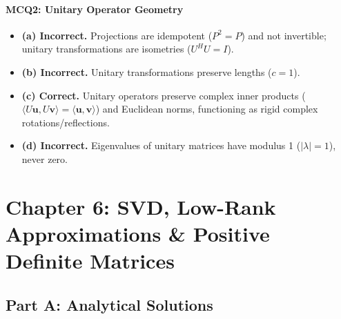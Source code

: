 \paragraph{MCQ2: Unitary Operator Geometry}
\begin{itemize}
    \item \textbf{(a) Incorrect.} Projections are idempotent ($P^2 = P$) and not invertible; unitary transformations are isometries ($U^H U = I$).
    \item \textbf{(b) Incorrect.} Unitary transformations preserve lengths ($c = 1$).
    \item \textbf{(c) Correct.} Unitary operators preserve complex inner products ($\langle U\mathbf{u}, U\mathbf{v} \rangle = \langle \mathbf{u}, \mathbf{v} \rangle$) and Euclidean norms, functioning as rigid complex rotations/reflections.
    \item \textbf{(d) Incorrect.} Eigenvalues of unitary matrices have modulus 1 ($|\lambda| = 1$), never zero.
\end{itemize}

\section*{Chapter 6: SVD, Low-Rank Approximations \& Positive Definite Matrices}

\subsection*{Part A: Analytical Solutions}

